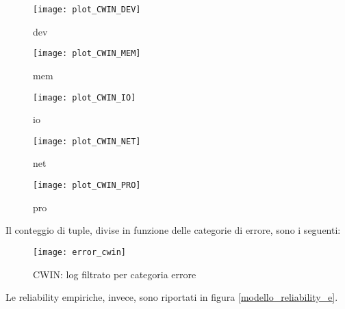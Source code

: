 \begin{minipage}{\linewidth}
  \centering
  \begin{minipage}{0.49\linewidth}
    \begin{figure}[H]
      \texttt{[image: plot\_CWIN\_DEV]}
      \caption*{dev}
    \end{figure}
  \end{minipage}
  \begin{minipage}{0.49\linewidth}
    \begin{figure}[H]
      \texttt{[image: plot\_CWIN\_MEM]}
      \caption*{mem}
    \end{figure}
  \end{minipage}
  \begin{minipage}{0.49\linewidth}
    \begin{figure}[H]
      \texttt{[image: plot\_CWIN\_IO]}
      \caption*{io}
    \end{figure}
  \end{minipage}
  \begin{minipage}{0.49\linewidth}
    \begin{figure}[H]
      \texttt{[image: plot\_CWIN\_NET]}
      \caption*{net}
    \end{figure}
  \end{minipage}
  \begin{minipage}{0.49\linewidth}
    \hspace{0.25\linewidth}
    \begin{figure}[H]
      \texttt{[image: plot\_CWIN\_PRO]}
      \caption*{pro}
    \end{figure}
  \end{minipage}
\end{minipage}
\label{cwin_categorie}

\clearpage

Il conteggio di tuple, divise in funzione delle categorie di errore, sono i
seguenti:

\begin{figure}[!htbp]
  \centering
  \texttt{[image: error\_cwin]}
  \caption{CWIN: log filtrato per categoria errore}
  \label{error_cwin}
\end{figure}

\clearpage

Le reliability empiriche, invece, sono riportati in figura \ref{modello_reliability_e}.\\

